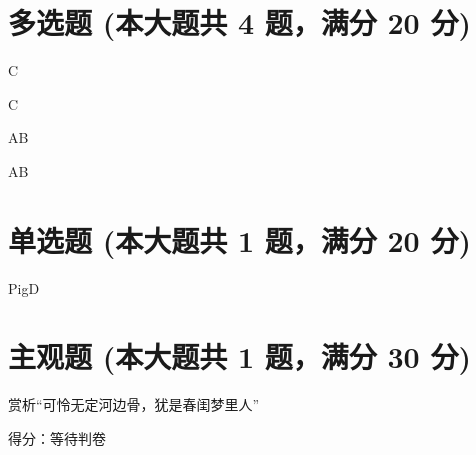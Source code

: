 \documentclass[12pt, a4paper, addpoints, answers]{exam}
\begin{document}
\hspace{5cm}

\section{\normalsize{多选题 (本大题共 4 题，满分 20 分)}}
\hspace{1.5cm}

\begin{questions}
\question[5] C

\begin{oneparcheckboxes}
\end{oneparcheckboxes}

\question[5] C

\begin{oneparcheckboxes}
\end{oneparcheckboxes}

\question[5] AB

\begin{oneparcheckboxes}
\end{oneparcheckboxes}

\question[5] AB

\begin{oneparcheckboxes}
\end{oneparcheckboxes}

\end{questions}

\hspace{5cm}

\section{\normalsize{单选题 (本大题共 1 题，满分 20 分)}}
\hspace{1.5cm}

\begin{questions}
\question[20] PigD

\begin{oneparchoices}
\end{oneparchoices}

\end{questions}

\hspace{5cm}

\section{\normalsize{主观题 (本大题共 1 题，满分 30 分)}}
\hspace{1.5cm}

\begin{questions}
\question[30] 赏析“可怜无定河边骨，犹是春闺梦里人”


得分：等待判卷   

\end{questions}
\end{document}
